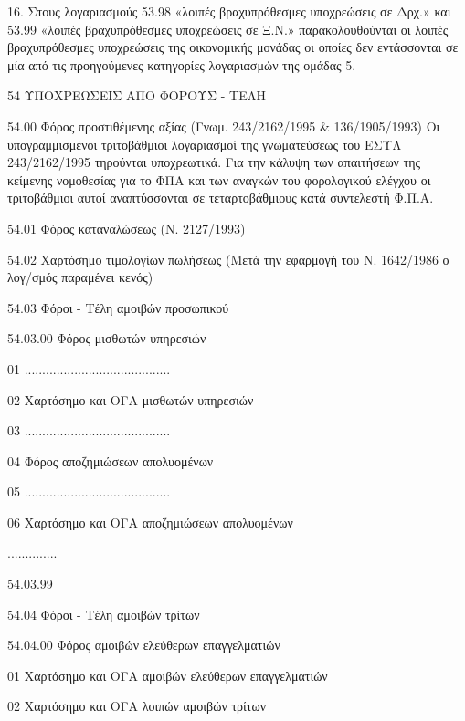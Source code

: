 \documentclass[A4,10pt,greek]{book}
\begin{document}
16. Στους λογαριασμούς 53.98 «λοιπές βραχυπρόθεσμες υποχρεώσεις σε Δρχ.» και 53.99 «λοιπές βραχυπρόθεσμες υποχρεώσεις σε Ξ.Ν.» παρακολουθούνται οι λοιπές βραχυπρόθεσμες υποχρεώσεις της οικονομικής μονάδας οι οποίες δεν εντάσσονται σε μία από τις προηγούμενες κατηγορίες λογαριασμών της ομάδας 5.

 54   ΥΠΟΧΡΕΩΣΕΙΣ ΑΠΟ ΦΟΡΟΥΣ - ΤΕΛΗ

        54.00   Φόρος προστιθέμενης αξίας (Γνωμ. 243/2162/1995 \& 136/1905/1993)
                      Οι υπογραμμισμένοι τριτοβάθμιοι λογαριασμοί της γνωματεύσεως
                      του ΕΣΥΛ 243/2162/1995 τηρούνται υποχρεωτικά. Για την κάλυψη των
                      απαιτήσεων της κείμενης νομοθεσίας για το ΦΠΑ και των αναγκών του
                      φορολογικού ελέγχου οι τριτοβάθμιοι αυτοί αναπτύσσονται σε
                      τεταρτοβάθμιους κατά συντελεστή Φ.Π.Α.

        54.01   Φόρος καταναλώσεως (Ν. 2127/1993)

        54.02   Χαρτόσημο τιμολογίων πωλήσεως
                     (Μετά την εφαρμογή του Ν. 1642/1986 ο λογ/σμός παραμένει κενός)

        54.03   Φόροι - Τέλη αμοιβών προσωπικού

                      54.03.00   Φόρος μισθωτών υπηρεσιών

                                01   .........................................

                                02   Χαρτόσημο και ΟΓΑ μισθωτών υπηρεσιών

                                03   .........................................

                                04   Φόρος αποζημιώσεων απολυομένων

                                05   .........................................

                                06   Χαρτόσημο και ΟΓΑ αποζημιώσεων απολυομένων

                      ..............

                      54.03.99

        54.04   Φόροι - Τέλη αμοιβών τρίτων

                      54.04.00   Φόρος αμοιβών ελεύθερων επαγγελματιών

                                01    Χαρτόσημο και ΟΓΑ αμοιβών ελεύθερων επαγγελματιών

                                02    Χαρτόσημο και ΟΓΑ λοιπών αμοιβών τρίτων
\end{document}

